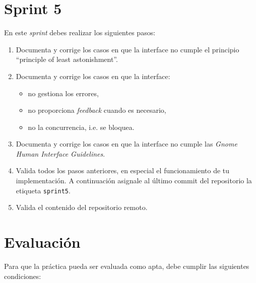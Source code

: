 \documentclass[11pt,a4paper]{article}
\begin{document}
\section{Sprint 5}

En este \emph{sprint} debes realizar los siguientes pasos:

\begin{enumerate}
\item Documenta y corrige los casos en que la interface no cumple el
  principio ``principle of least astonishment''.

\item Documenta y corrige los casos en que la interface:
  \begin{itemize}
  \item no gestiona los errores,
  \item no proporciona \textit{feedback} cuando es necesario,
  \item no la concurrencia, i.e. se bloquea.
  \end{itemize}

\item Documenta y corrige los casos en que la interface no cumple las
  \emph{Gnome Human Interface Guidelines}.

\item Valida todos los pasos anteriores, en especial el funcionamiento
  de tu implementación. A continuación asignale al último commit del
  repositorio la etiqueta \texttt{sprint5}.

\item Valida el contenido del repositorio remoto.
\end{enumerate}






\section{Evaluación}

Para que la práctica pueda ser evaluada como apta, debe cumplir las
siguientes condiciones:
\end{document}
